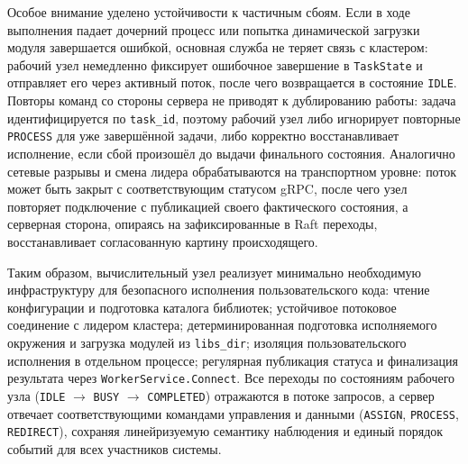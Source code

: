 Особое внимание уделено устойчивости к частичным сбоям. Если в ходе выполнения
падает дочерний процесс или попытка динамической загрузки модуля завершается
ошибкой, основная служба не теряет связь с кластером: рабочий узел немедленно
фиксирует ошибочное завершение в \texttt{TaskState} и отправляет его через
активный поток, после чего возвращается в состояние \texttt{IDLE}. Повторы
команд со стороны сервера не приводят к дублированию работы: задача
идентифицируется по \texttt{task\_id}, поэтому рабочий узел либо игнорирует повторные
\texttt{PROCESS} для уже завершённой задачи, либо корректно восстанавливает
исполнение, если сбой произошёл до выдачи финального состояния. Аналогично
сетевые разрывы и смена лидера обрабатываются на транспортном уровне: поток
может быть закрыт с соответствующим статусом gRPC, после чего узел повторяет
подключение с публикацией своего фактического состояния, а серверная сторона,
опираясь на зафиксированные в Raft переходы, восстанавливает согласованную
картину происходящего.

Таким образом, вычислительный узел реализует минимально необходимую
инфраструктуру для безопасного исполнения пользовательского кода: чтение
конфигурации и подготовка каталога библиотек; устойчивое потоковое соединение с
лидером кластера; детерминированная подготовка исполняемого окружения и
загрузка модулей из \texttt{libs\_dir}; изоляция пользовательского исполнения в
отдельном процессе; регулярная публикация статуса и финализация результата
через \texttt{WorkerService.Connect}. Все переходы по состояниям рабочего узла
(\texttt{IDLE} $\rightarrow$ \texttt{BUSY} $\rightarrow$ \texttt{COMPLETED})
отражаются в потоке запросов, а сервер отвечает соответствующими командами
управления и данными (\texttt{ASSIGN}, \texttt{PROCESS}, \texttt{REDIRECT}),
сохраняя линейризуемую семантику наблюдения и единый порядок событий для всех
участников системы.
